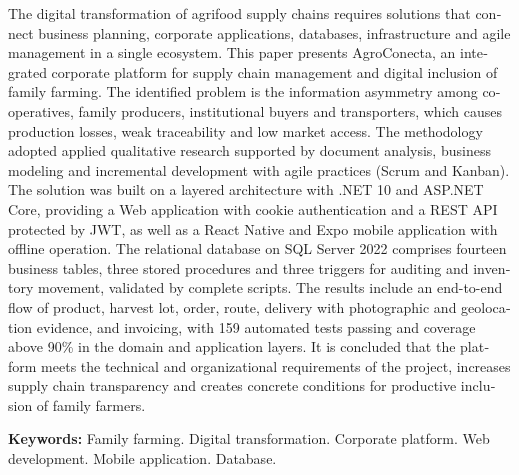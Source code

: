 \newpage
\begingroup
{}
\begin{otherlanguage}{english}

The digital transformation of agrifood supply chains requires solutions that
connect business planning, corporate applications, databases, infrastructure and
agile management in a single ecosystem. This paper presents AgroConecta, an
integrated corporate platform for supply chain management and digital inclusion
of family farming. The identified problem is the information asymmetry among
cooperatives, family producers, institutional buyers and transporters, which
causes production losses, weak traceability and low market access. The
methodology adopted applied qualitative research supported by document analysis,
business modeling and incremental development with agile practices (Scrum and
Kanban). The solution was built on a layered architecture with .NET 10 and
ASP.NET Core, providing a Web application with cookie authentication and a REST
API protected by JWT, as well as a React Native and Expo mobile application with
offline operation. The relational database on SQL Server 2022 comprises fourteen
business tables, three stored procedures and three triggers for auditing and
inventory movement, validated by complete scripts. The results include an
end-to-end flow of product, harvest lot, order, route, delivery with photographic
and geolocation evidence, and invoicing, with 159 automated tests passing and
coverage above 90\% in the domain and application layers. It is concluded that
the platform meets the technical and organizational requirements of the project,
increases supply chain transparency and creates concrete conditions for
productive inclusion of family farmers.

\vspace{0.5\baselineskip}
\noindent\textbf{Keywords:} Family farming. Digital transformation. Corporate
platform. Web development. Mobile application. Database.
\end{otherlanguage}
\endgroup

\newpage
\begingroup
{}
\tableofcontents
\endgroup
